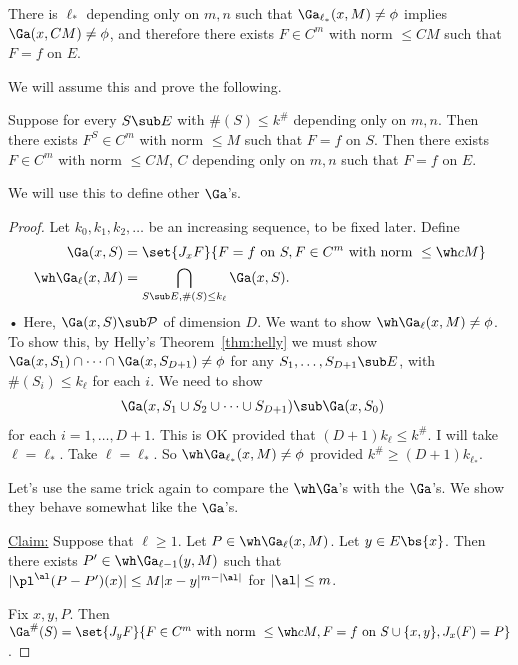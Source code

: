 
\begin{thm}
There is $\ell_*$ depending only on $m,n$ such that
$\Ga_{\ell_*}(x,M)\ne \phi$ implies $\Ga(x,CM)\ne \phi$, and therefore there exists $F\in C^m$ with norm $\le CM$ such that $F=f$ on $E$.
\end{thm}
We will assume this and prove the following.
\begin{thm}%
Suppose for every $S\sub E$ with $\#(S)\le k^\#$ depending only on $m,n$. Then there exists $F^S\in C^m$ with norm $\le M$ such that $F=f$ on $S$. Then there exists $F\in C^m$ with norm $\le CM$, $C$ depending only on $m,n$ such that $F=f$ on $E$. 
\end{thm}
We will use this to define other $\Ga$'s.

\begin{proof}
Let $k_0,k_1,k_2,\ldots$ be an increasing sequence, to be fixed later. Define
\begin{align}
\Ga(x,S) &= \set{J_xF}{F=f\text{ on }S, F\in C^m\text{ with norm }\le \wh cM}\\
\wh \Ga_\ell(x,M) &=
\bigcap_{S\sub E, \#(S)\le k_\ell} \Ga(x,S).
\end{align}•
Here, $\Ga(x,S)\sub \cal P$ of dimension $D$. We want to show $\wh \Ga_\ell(x,M)\ne \phi$. To show this, by Helly's Theorem~\ref{thm:helly} we must show $\Ga(x,S_1)\cap \cdots \cap \Ga(x,S_{D+1})\ne \phi$ for any $S_1,\ldots, S_{D+1}\sub E$, with $\#(S_i)\le k_\ell$ for each $i$. We need to show
\begin{align}
\Ga(x,S_1\cup S_2\cup \cdots \cup S_{D+1})
&\sub \Ga(x,S_0)
\end{align}
for each $i=1,\ldots, D+1$. This is OK provided that $(D+1)k_\ell\le k^\#$. I will take $\ell=\ell_*$. Take $\ell=\ell_*$. So $\wh \Ga_{\ell_*}(x,M)\ne \phi$ provided $k^\#\ge (D+1)k_{\ell_*}$. %

Let's use the same trick again to compare the $\wh \Ga$'s with the $\Ga$'s. We show they behave somewhat like the $\Ga$'s.

\ul{Claim:} Suppose that $\ell\ge 1$. Let $P\in \wh \Ga_\ell(x,M)$. Let $y\in E\bs \{x\}$. Then there exists $P'\in \wh \Ga_{\ell-1}(y,M)$ such that $|\pl^\al(P-P')(x)|\le M|x-y|^{m-|\al|}$ for $|\al|\le m$. 

Fix $x,y,P$. Then $\Ga^\#(S) = \set{J_yF}{F\in C^m \text{ with norm }\le \wh c M, F=f\text{ on }S\cup \{x,y\}, J_x(F)=P}$.


\end{proof}
